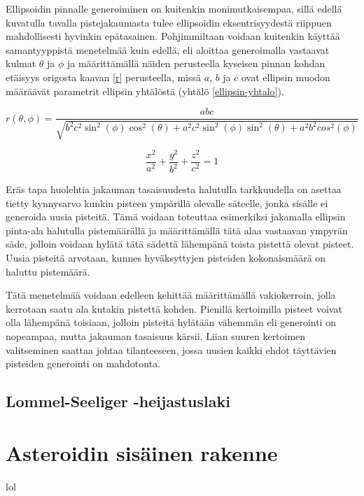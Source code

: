 \documentclass[12pt,a4paper,titlepage]{article}
\begin{document}
Ellipsoidin pinnalle generoiminen on kuitenkin monimutkaisempaa, sillä edellä kuvatulla tavalla pistejakaumasta tulee ellipsoidin eksentrisyydestä riippuen mahdollisesti hyvinkin epätasainen. Pohjimmiltaan voidaan kuitenkin käyttää samantyyppistä menetelmää kuin edellä, eli aloittaa generoimalla vastaavat kulmat $\theta$ ja $\phi$ ja määrittämällä näiden perusteella kyseisen pinnan kohdan etäisyys origosta kaavan \ref{r} perusteella, missä $a$, $b$ ja $c$ ovat ellipsin muodon määräävät parametrit ellipsin yhtälöstä (yhtälö \ref{ellipsin-yhtalo}).

\begin{equation}\label{r}
	r(\theta,\phi) = \frac{abc}{\sqrt{b^2c^2\sin^2(\phi)\cos^2(\theta)+a^2c^2\sin^2(\phi)\sin^2(\theta)+a^2b^2cos^2(\phi)}}
\end{equation}

\begin{equation}\label{ellipsin-yhtalo}
	\frac{x^2}{a^2}+\frac{y^2}{b^2}+\frac{z^2}{c^2} = 1
\end{equation}

Eräs tapa huolehtia jakauman tasaisuudesta halutulla tarkkuudella on asettaa tietty kynnysarvo kunkin pisteen ympärillä olevalle säteelle, jonka sisälle ei generoida uusia pisteitä. Tämä voidaan toteuttaa esimerkiksi jakamalla ellipsin pinta-ala halutulla pistemäärällä ja määrittämällä tätä alaa vastaavan ympyrän säde, jolloin voidaan hylätä tätä sädettä lähempänä toista pistettä olevat pisteet. Uusia pisteitä arvotaan, kunnes hyväksyttyjen pisteiden kokonaismäärä on haluttu pistemäärä.

Tätä menetelmää voidaan edelleen kehittää määrittämällä vakiokerroin, jolla kerrotaan saatu ala kutakin pistettä kohden. Pienillä kertoimilla pisteet voivat olla lähempänä toisiaan, jolloin pisteitä hylätään vähemmän eli generointi on nopeampaa, mutta jakauman tasaisuus kärsii. Liian suuren kertoimen valitseminen saattaa johtaa tilanteeseen, jossa uusien kaikki ehdot täyttävien pisteiden generointi on mahdotonta.

\subsection{Lommel-Seeliger -heijastuslaki}



\section{Asteroidin sisäinen rakenne}
lol
\end{document}
